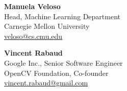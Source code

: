 \textbf{Manuela Veloso}\\
Head, Machine Learning Department\\
Carnegie Mellon University\\
\href{mailto:veloso@cs.cmu.edu}{veloso@cs.cmu.edu}

\textbf{Vincent Rabaud}\\
Google Inc., Senior Software Engineer\\
OpenCV Foundation, Co-founder\\
\href{mailto:vincent.rabaud@gmail.com}{vincent.rabaud@gmail.com}


